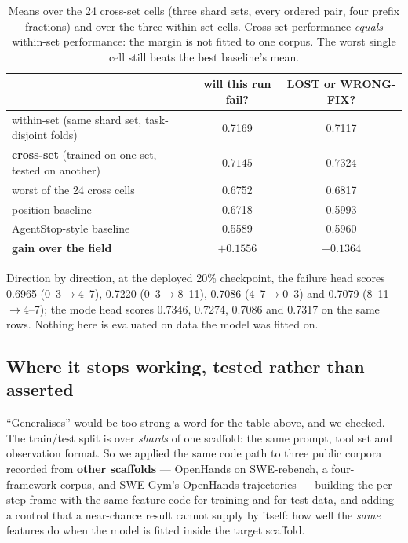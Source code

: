 \documentclass[10pt]{article}
\begin{document}
\begin{table}[h]
\centering\small
\begin{tabular}{lcc}
\toprule
& will this run fail? & LOST or WRONG-FIX? \\
\midrule
within-set (same shard set, task-disjoint folds) & 0.7169 & 0.7117 \\
\textbf{cross-set} (trained on one set, tested on another) & $\mathbf{0.7145}$ & $\mathbf{0.7324}$ \\
worst of the 24 cross cells & 0.6752 & 0.6817 \\
\addlinespace
position baseline & 0.6718 & 0.5993 \\
AgentStop-style baseline & 0.5589 & 0.5960 \\
\midrule
\textbf{gain over the field} & $\mathbf{+0.1556}$ & $\mathbf{+0.1364}$ \\
\bottomrule
\end{tabular}
\caption{Means over the 24 cross-set cells (three shard sets, every ordered pair, four prefix
fractions) and over the three within-set cells. Cross-set performance \emph{equals} within-set
performance: the margin is not fitted to one corpus. The worst single cell still beats the best
baseline's mean.}
\end{table}

\noindent Direction by direction, at the deployed 20\% checkpoint, the failure head scores 0.6965
(0--3$\rightarrow$4--7), 0.7220 (0--3$\rightarrow$8--11), 0.7086 (4--7$\rightarrow$0--3) and 0.7079
(8--11$\rightarrow$4--7); the mode head scores 0.7346, 0.7274, 0.7086 and 0.7317 on the same rows.
Nothing here is evaluated on data the model was fitted on.


\subsection{Where it stops working, tested rather than asserted}

``Generalises'' would be too strong a word for the table above, and we checked. The train/test
split is over \emph{shards} of one scaffold: the same prompt, tool set and observation format. So
we applied the same code path to three public corpora recorded from \textbf{other scaffolds} ---
OpenHands on SWE-rebench, a four-framework corpus, and SWE-Gym's OpenHands trajectories ---
building the per-step frame with the same feature code for training and for test data, and adding a
control that a near-chance result cannot supply by itself: how well the \emph{same} features do when
the model is fitted inside the target scaffold.
\end{document}
